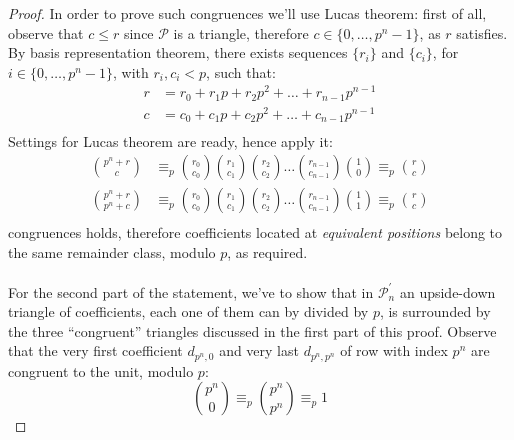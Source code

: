 \documentclass[11pt,a4paper]{article} %
\begin{document}
\begin{proof}
      In order to prove such congruences we'll use Lucas theorem:
      first of all, observe that $c \leq r$ since $\mathcal{P}$ is a
      triangle, therefore $c \in \lbrace 0, \ldots, p^n -1 \rbrace$,
      as $r$ satisfies.  By basis representation theorem, there exists
      sequences $\lbrace r_i\rbrace$ and $\lbrace c_i\rbrace$, for
      $i \in \lbrace 0, \ldots, p^n -1 \rbrace$, with $r_i,c_i < p$,
      such that:
      \begin{displaymath}
        \begin{split}
          r &= r_0 + r_1 p + r_2 p^2 + \ldots + r_{n-1}p^{n-1} \\
          c &= c_0 + c_1 p + c_2 p^2 + \ldots + c_{n-1}p^{n-1} \\
        \end{split}
      \end{displaymath}
      Settings for Lucas theorem are ready, hence apply it:
      \begin{displaymath}
        \begin{split}
          {{p^n+r} \choose {c}} &\equiv_{p} {{r_0} \choose {c_0}} {{r_1} \choose {c_1}}{{r_2} \choose {c_2}} \ldots 
          {{r_{n-1}} \choose {c_{n-1}}}{{1} \choose {0}} \equiv_{p} {{r} \choose {c}}\\
          {{p^n+r} \choose {p^n+c}} &\equiv_{p} {{r_0} \choose {c_0}} {{r_1} \choose {c_1}}{{r_2} \choose {c_2}} \ldots 
          {{r_{n-1}} \choose {c_{n-1}}}{{1} \choose {1}} \equiv_{p} {{r} \choose {c}}\\
        \end{split}
      \end{displaymath}
      congruences holds, therefore coefficients located at
      \emph{equivalent positions} belong to the same remainder class,
      modulo $p$, as required.
      \\\\
      For the second part of the statement, we've to show that in
      $\mathcal{P}_{n}^\prime$ an upside-down triangle of
      coefficients, each one of them can by divided by $p$, is
      surrounded by the three ``congruent'' triangles discussed in the
      first part of this proof.  Observe that the very first
      coefficient $d_{p^n, 0}$ and very last $d_{p^n, p^n}$ of row
      with index $p^n$ are congruent to the unit, modulo $p$:
      \begin{displaymath}
        {{p^n} \choose {0}} \equiv_{p}{{p^n} \choose {p^n}} \equiv_{p} 1
      \end{displaymath}

\end{proof}
\end{document}

